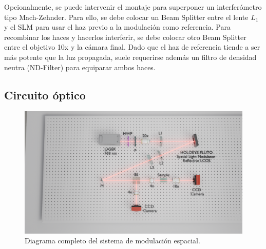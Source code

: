 Opcionalmente, se puede intervenir el montaje para superponer un interferómetro tipo Mach-Zehnder. Para ello, se debe colocar un Beam Splitter entre el lente $L_1$ y el SLM para usar el haz previo a la modulación como referencia. Para recombinar los haces y hacerlos interferir, se debe colocar otro Beam Splitter entre el objetivo 10x y la cámara final. Dado que el haz de referencia tiende a ser más potente que la luz propagada, suele requerirse además un filtro de densidad neutra (ND-Filter) para equiparar ambos haces.

\subsection{Circuito óptico}
\begin{figure}[H]
    \centering
    \includegraphics[width=\linewidth, trim={21cm 5cm 7cm 5cm},clip]{media/SLM_setupv1}
    \caption{Diagrama completo del sistema de modulación espacial.}
\end{figure}
